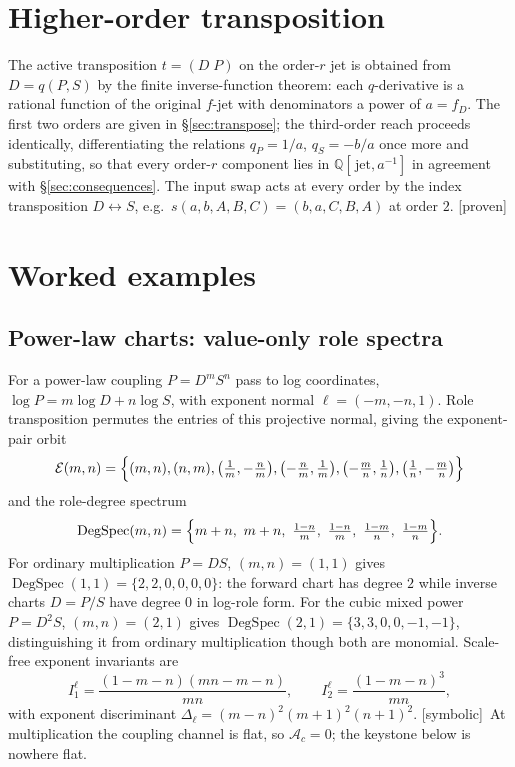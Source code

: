 \documentclass[11pt]{article}
\newcommand{\Proven}{\textsf{[proven]}}
\newcommand{\Symbolic}{\textsf{[symbolic]}}
\theoremstyle{plain}
\theoremstyle{definition}
\newcommand{\Ac}{\mathcal{A}_c}
\begin{document}
\appendix
\section{Higher-order transposition}
\label{app:higher}

The active transposition $t=(D\;P)$ on the order-$r$ jet is obtained from $D=q(P,S)$ by the finite
inverse-function theorem: each $q$-derivative is a rational function of the original $f$-jet with
denominators a power of $a=f_D$. The first two orders are given in \S\ref{sec:transpose}; the
third-order reach proceeds identically, differentiating the relations
$q_P=1/a$, $q_S=-b/a$ once more and substituting, so that every order-$r$ component lies in
$\mathbb Q[\,\text{jet},a^{-1}]$ in agreement with \S\ref{sec:consequences}. The input swap acts at
every order by the index transposition $D\leftrightarrow S$, e.g.\ $s(a,b,A,B,C)=(b,a,C,B,A)$ at
order $2$. \Proven

\section{Worked examples}
\label{app:examples}

\subsection{Power-law charts: value-only role spectra}
For a power-law coupling $P=D^mS^n$ pass to log coordinates, $\log P=m\log D+n\log S$, with exponent
normal $\ell=(-m,-n,1)$. Role transposition permutes the entries of this projective normal, giving the
exponent-pair orbit
\[
\mathcal E(m,n)=\Bigl\{(m,n),(n,m),\bigl(\tfrac1m,-\tfrac nm\bigr),\bigl(-\tfrac nm,\tfrac1m\bigr),
\bigl(-\tfrac mn,\tfrac1n\bigr),\bigl(\tfrac1n,-\tfrac mn\bigr)\Bigr\}
\]
and the role-degree spectrum
\[
\operatorname{DegSpec}(m,n)=\Bigl\{m+n,\ m+n,\ \tfrac{1-n}{m},\ \tfrac{1-n}{m},\ \tfrac{1-m}{n},\
\tfrac{1-m}{n}\Bigr\}.
\]
For ordinary multiplication $P=DS$, $(m,n)=(1,1)$ gives $\operatorname{DegSpec}(1,1)=\{2,2,0,0,0,0\}$:
the forward chart has degree $2$ while inverse charts $D=P/S$ have degree $0$ in log-role form. For
the cubic mixed power $P=D^2S$, $(m,n)=(2,1)$ gives
$\operatorname{DegSpec}(2,1)=\{3,3,0,0,-1,-1\}$, distinguishing it from ordinary multiplication though
both are monomial. Scale-free exponent invariants are
\[
I_1^\ell=\frac{(1-m-n)(mn-m-n)}{mn},\qquad
I_2^\ell=\frac{(1-m-n)^3}{mn},
\]
with exponent discriminant $\Delta_\ell=(m-n)^2(m+1)^2(n+1)^2$. \Symbolic\ At
multiplication the coupling channel is flat, so $\Ac=0$; the keystone below is nowhere flat.
\end{document}
